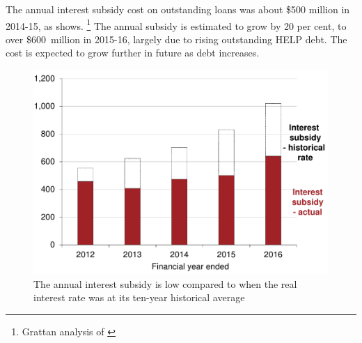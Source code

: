 \documentclass[embargoed]{grattan}
\begin{document}
The annual interest subsidy cost on outstanding loans was about \$500 million in 2014-15, as  shows.%
\footnote{Grattan analysis of \textcites{ABS2015Educationwork2015}{RBA2016Exchangeratesdaily}{RBA2016F21Capitalmarket}} %
The annual subsidy is estimated to grow by 20 per cent, to over \$600~million in 2015-16, largely due to rising outstanding \gls{HELP} debt.
The cost is expected to grow further in future as debt increases.

\begin{figure}
\caption{The annual interest subsidy is low compared to when the real interest rate was at its ten-year historical average}\label{fig:fig1-annual-interest-subsidy-is-low-compared-to-when-the-real-interest-rate-was-at-its-10-year-hist-avg}

\includegraphics[page=1]{atlas/Chartpack.pdf}


\end{figure}
\end{document}
